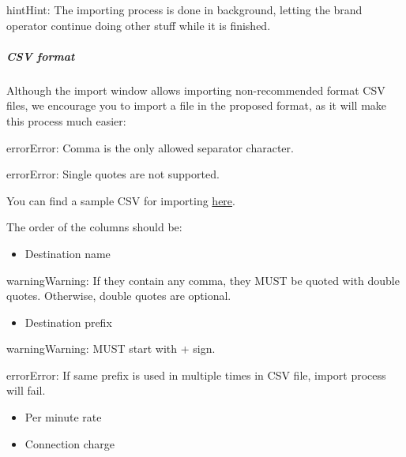 \documentclass[letterpaper,10pt,english]{sphinxmanual}
\begin{document}
\begin{notice}{hint}{Hint:}
The importing process is done in background, letting the brand operator
continue doing other stuff while it is finished.
\end{notice}


\subparagraph{CSV format}
\label{administration_portal/brand/billing/destination_rates:csv-format}
Although the import window allows importing non-recommended format CSV files,
we encourage you to import a file in the proposed format, as it will make
this process much easier:

\begin{notice}{error}{Error:}
Comma is the only allowed separator character.
\end{notice}

\begin{notice}{error}{Error:}
Single quotes are not supported.
\end{notice}

You can find a sample CSV for importing \href{https://raw.githubusercontent.com/irontec/ivozprovider/bleeding/web/portal/brand/samples/billing/pricesSample.csv}{here}.

The order of the columns should be:
\begin{itemize}
\item {} 
Destination name

\end{itemize}

\begin{notice}{warning}{Warning:}
If they contain any comma, they MUST be quoted with double quotes. Otherwise, double quotes are optional.
\end{notice}
\begin{itemize}
\item {} 
Destination prefix

\end{itemize}

\begin{notice}{warning}{Warning:}
MUST start with + sign.
\end{notice}

\begin{notice}{error}{Error:}
If same prefix is used in multiple times in CSV file, import process will fail.
\end{notice}
\begin{itemize}
\item {} 
Per minute rate

\item {} 
Connection charge

\end{itemize}
\end{document}
